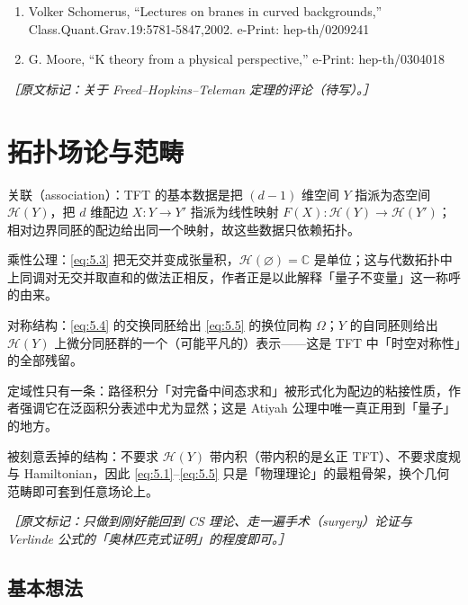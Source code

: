 \begin{enumerate}
  \item Volker Schomerus, “Lectures on branes in curved backgrounds,” Class.Quant.Grav.19:5781-5847,2002. e-Print: hep-th/0209241
  \item G. Moore, “K theory from a physical perspective,” e-Print: hep-th/0304018
\end{enumerate}

{\small\itshape ［原文标记：关于 Freed–Hopkins–Teleman 定理的评论（待写）。］}

\section{拓扑场论与范畴} %

\begin{keytakeaways}
  \item 关联（association）：TFT 的基本数据是把 $(d-1)$ 维空间 $Y$ 指派为态空间 $\mathcal{H}(Y)$，把 $d$ 维配边 $X:Y\to Y'$ 指派为线性映射 $F(X):\mathcal{H}(Y)\to\mathcal{H}(Y')$；相对边界同胚的配边给出同一个映射，故这些数据只依赖拓扑。
  \item 乘性公理：\eqref{eq:5.3} 把无交并变成张量积，$\mathcal{H}(\varnothing)=\mathbb{C}$ 是单位；这与代数拓扑中上同调对无交并取直和的做法正相反，作者正是以此解释「量子不变量」这一称呼的由来。
  \item 对称结构：\eqref{eq:5.4} 的交换同胚给出 \eqref{eq:5.5} 的换位同构 $\Omega$；$Y$ 的自同胚则给出 $\mathcal{H}(Y)$ 上微分同胚群的一个（可能平凡的）表示——这是 TFT 中「时空对称性」的全部残留。
  \item 定域性只有一条：路径积分「对完备中间态求和」被形式化为配边的粘接性质，作者强调它在泛函积分表述中尤为显然；这是 Atiyah 公理中唯一真正用到「量子」的地方。
  \item 被刻意丢掉的结构：不要求 $\mathcal{H}(Y)$ 带内积（带内积的是幺正 TFT）、不要求度规与 Hamiltonian，因此 \eqref{eq:5.1}–\eqref{eq:5.5} 只是「物理理论」的最粗骨架，换个几何范畴即可套到任意场论上。
\end{keytakeaways}

{\small\itshape ［原文标记：只做到刚好能回到 CS 理论、走一遍手术（surgery）论证与 Verlinde 公式的「奥林匹克式证明」的程度即可。］}

\subsection{基本想法} %

